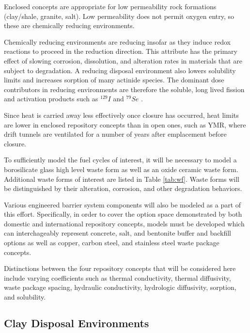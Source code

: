 Enclosed concepts are appropriate for low permeability rock formations (clay/shale, 
granite, salt).  Low permeability does not permit oxygen entry, so these are
chemically reducing environments.  

Chemically reducing environments are reducing insofar as they induce redox 
reactions to proceed in the reduction direction. This attribute has the primary 
effect of slowing corrosion, dissolution, and  alteration rates in materials 
that are subject to degradation. A reducing disposal environment also lowers 
solubility limits and increases sorption of many actinide species. The dominant 
dose contributors in reducing environments are therefore the soluble, long 
lived fission and activation products such as $^{129}I$ and $^{79}Se$ 
\cite{oecd-nea_advanced_2006, von_lensa_red-impact_2008}.  

Since heat is carried away less effectively once closure 
has occurred, heat limits are lower in enclosed repository concepts than in open 
ones, such as \gls{YMR}, where drift tunnels are ventilated for a number of years
after emplacement before closure.

To sufficiently model the fuel cycles of interest, it will be necessary to model 
a borosilicate glass high level waste form as well as an oxide ceramic waste 
form. Additional waste forms 
of interest are listed in Table \ref{tab:wf}. Waste forms will be 
distinguished by their alteration, corrosion, and other degradation behaviors.

Various engineered barrier system components will also be modeled as a part of 
this effort.  Specifically, in order to cover the option space demonstrated by 
both domestic and international repository concepts, models must be developed 
which can interchageably represent concrete, salt, and bentonite buffer and 
backfill options as well as copper, carbon steel, and stainless steel waste 
package concepts.  

Distinctions between the four repository concepts that will be considered here 
include varying coefficients such as thermal conductivity, thermal diffusivity, 
waste package spacing,  hydraulic conductivity,  hydrologic diffusivity, 
sorption, and solubility.

\subsection{Clay Disposal Environments}

